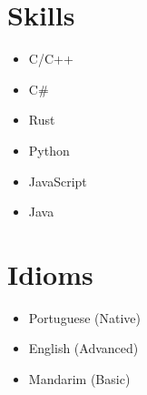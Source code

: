 \documentclass[11pt,a4paper,sans]{moderncv}        %
\begin{document}
\section{Skills}

\vspace{-1.0em}\begin{small}
 \begin{multicols}{2}
    \begin{itemize}
\item C/C++ 
\item C\#  
\item Rust 
\item Python 
\item JavaScript 
\item Java 
    \end{itemize}
\end{multicols}\end{small}

\section{Idioms}
\begin{itemize}
\item Portuguese (Native)
\item English (Advanced)
\item Mandarim (Basic)
\end{itemize}
\end{document}
